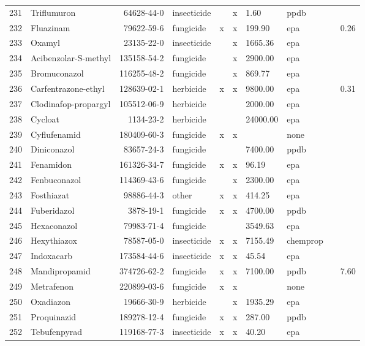 \begin{longtable}{lp{3cm}rlp{0.5cm}p{0.5cm}p{1.5cm}p{1cm}p{1cm}p{1cm}}
  231 & Triflumuron & 64628-44-0 & insecticide &  & x & 1.60 & ppdb &  &  \\ 
  232 & Fluazinam & 79622-59-6 & fungicide & x & x & 199.90 & epa &  & 0.26 \\ 
  233 & Oxamyl & 23135-22-0 & insecticide &  & x & 1665.36 & epa &  &  \\ 
  234 & Acibenzolar-S-methyl & 135158-54-2 & fungicide &  & x & 2900.00 & epa &  &  \\ 
  235 & Bromuconazol & 116255-48-2 & fungicide &  & x & 869.77 & epa &  &  \\ 
  236 & Carfentrazone-ethyl & 128639-02-1 & herbicide & x & x & 9800.00 & epa &  & 0.31 \\ 
  237 & Clodinafop-propargyl & 105512-06-9 & herbicide &  &  & 2000.00 & epa &  &  \\ 
  238 & Cycloat & 1134-23-2 & herbicide &  &  & 24000.00 & epa &  &  \\ 
  239 & Cyflufenamid & 180409-60-3 & fungicide & x & x &  & none &  &  \\ 
  240 & Diniconazol & 83657-24-3 & fungicide &  &  & 7400.00 & ppdb &  &  \\ 
  241 & Fenamidon & 161326-34-7 & fungicide & x & x & 96.19 & epa &  &  \\ 
  242 & Fenbuconazol & 114369-43-6 & fungicide &  & x & 2300.00 & epa &  &  \\ 
  243 & Fosthiazat & 98886-44-3 & other & x & x & 414.25 & epa &  &  \\ 
  244 & Fuberidazol & 3878-19-1 & fungicide & x & x & 4700.00 & ppdb &  &  \\ 
  245 & Hexaconazol & 79983-71-4 & fungicide &  &  & 3549.63 & epa &  &  \\ 
  246 & Hexythiazox & 78587-05-0 & insecticide & x & x & 7155.49 & chemprop &  &  \\ 
  247 & Indoxacarb & 173584-44-6 & insecticide & x & x & 45.54 & epa &  &  \\ 
  248 & Mandipropamid & 374726-62-2 & fungicide & x & x & 7100.00 & ppdb &  & 7.60 \\ 
  249 & Metrafenon & 220899-03-6 & fungicide & x & x &  & none &  &  \\ 
  250 & Oxadiazon & 19666-30-9 & herbicide &  & x & 1935.29 & epa &  &  \\ 
  251 & Proquinazid & 189278-12-4 & fungicide & x & x & 287.00 & ppdb &  &  \\ 
  252 & Tebufenpyrad & 119168-77-3 & insecticide & x & x & 40.20 & epa &  &  \\ 

\end{longtable}

